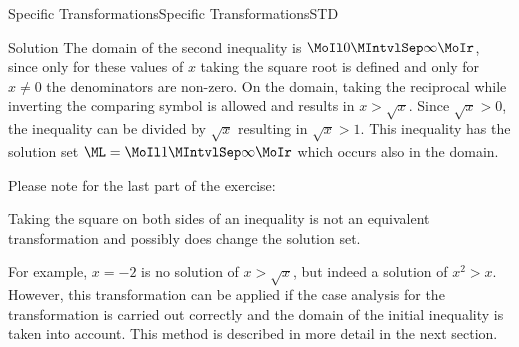 \begin{MXContent}{Specific Transformations}{Specific Transformations}{STD}
\begin{MExercise}
\begin{MHint}{Solution}
The domain of the second inequality is $\MoIl 0\MIntvlSep \infty\MoIr$, since 
only for these values of $x$ taking the square root is
defined and only for $x\neq 0$ the denominators are non-zero. On the domain, 
taking the reciprocal while inverting the comparing symbol is 
allowed and results in $x>\sqrt{x}$. Since $\sqrt{x}>0$, the inequality can be 
divided by $\sqrt{x}$ resulting in $\sqrt{x}>1$. This inequality has the solution
set $\ML=\MoIl 1\MIntvlSep \infty\MoIr$ which occurs also in the domain.
\end{MHint}

\end{MExercise}

Please note for the last part of the exercise:

\begin{MInfo}
Taking the square on both sides of an inequality is not an equivalent transformation and 
possibly does change the solution set.
\end{MInfo}

For example, $x=-2$ is no solution of $x>\sqrt{x}$, but indeed a solution of $x^2>x$. However,
this transformation can be applied if the case analysis for the transformation
is carried out correctly and the domain of the initial inequality is taken into account. This method is
described in more detail in the next section.
\end{MXContent}


